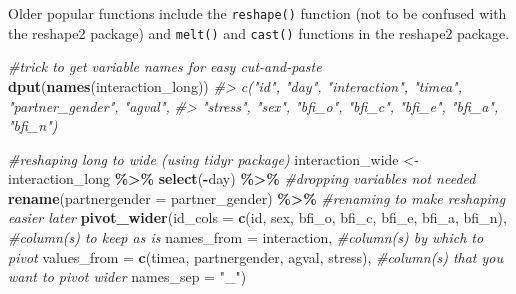 \documentclass[
]{book}
\newenvironment{Shaded}{\begin{snugshade}}{\end{snugshade}}
\newcommand{\AttributeTok}[1]{\textcolor[rgb]{0.13,0.29,0.53}{#1}}
\newcommand{\CommentTok}[1]{\textcolor[rgb]{0.56,0.35,0.01}{\textit{#1}}}
\newcommand{\FunctionTok}[1]{\textcolor[rgb]{0.13,0.29,0.53}{\textbf{#1}}}
\newcommand{\NormalTok}[1]{#1}
\newcommand{\OtherTok}[1]{\textcolor[rgb]{0.56,0.35,0.01}{#1}}
\newcommand{\SpecialCharTok}[1]{\textcolor[rgb]{0.81,0.36,0.00}{\textbf{#1}}}
\newcommand{\StringTok}[1]{\textcolor[rgb]{0.31,0.60,0.02}{#1}}
\theoremstyle{definition}
\theoremstyle{definition}
\theoremstyle{definition}
\theoremstyle{definition}
\theoremstyle{remark}
\begin{document}
Older popular functions include the \texttt{reshape()} function (not to be confused with the reshape2 package) and \texttt{melt()} and \texttt{cast()} functions in the reshape2 package.

\begin{Shaded}
\begin{Highlighting}[]
\CommentTok{\#trick to get variable names for easy cut{-}and{-}paste}
\FunctionTok{dput}\NormalTok{(}\FunctionTok{names}\NormalTok{(interaction\_long))}
\CommentTok{\#\textgreater{} c("id", "day", "interaction", "timea", "partner\_gender", "agval", }
\CommentTok{\#\textgreater{} "stress", "sex", "bfi\_o", "bfi\_c", "bfi\_e", "bfi\_a", "bfi\_n")}

\CommentTok{\#reshaping long to wide (using tidyr package)}
\NormalTok{interaction\_wide }\OtherTok{\textless{}{-}}\NormalTok{interaction\_long }\SpecialCharTok{\%\textgreater{}\%}
  \FunctionTok{select}\NormalTok{(}\SpecialCharTok{{-}}\NormalTok{day) }\SpecialCharTok{\%\textgreater{}\%} \CommentTok{\#dropping variables not needed}
  \FunctionTok{rename}\NormalTok{(}\AttributeTok{partnergender =}\NormalTok{ partner\_gender) }\SpecialCharTok{\%\textgreater{}\%} \CommentTok{\#renaming to make reshaping easier later}
  \FunctionTok{pivot\_wider}\NormalTok{(}\AttributeTok{id\_cols =} \FunctionTok{c}\NormalTok{(id, sex, bfi\_o, bfi\_c, bfi\_e, bfi\_a, bfi\_n), }\CommentTok{\#column(s) to keep as is}
              \AttributeTok{names\_from =}\NormalTok{ interaction, }\CommentTok{\#column(s) by which to pivot}
              \AttributeTok{values\_from =} \FunctionTok{c}\NormalTok{(timea, partnergender, agval, stress), }\CommentTok{\#column(s) that you want to pivot wider}
              \AttributeTok{names\_sep =} \StringTok{"\_"}\NormalTok{)}


\end{Highlighting}
\end{Shaded}
\end{document}
